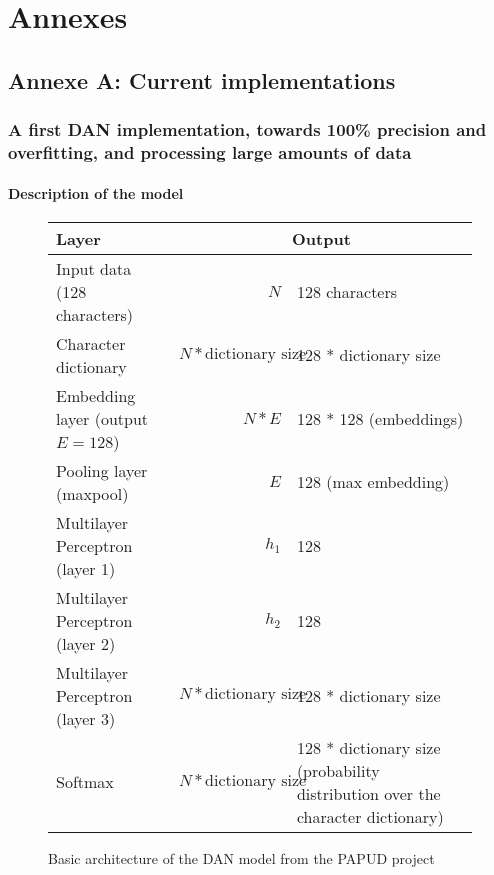 \part*{Annexes}

\chapter*{Annexe A: Current implementations}

\makeatletter
\renewcommand{\thesection}{\@arabic\c@section}
\makeatother

\section{A first DAN implementation, towards 100\% precision and overfitting, and processing large amounts of data\label{annex}}

\subsection{Description of the model}
\begin{figure}[H]
\begin{center}
\begin{tabularx}{.9\textwidth}{|l|r|X|}
	\hline 
	{\bfseries Layer} & \multicolumn{2}{|c|}{\bfseries Output} \\ 
	\hline 
	Input data (128 characters) &  $N$ & {128 characters} \\ 
	\hline 
	Character dictionary & $N * \text{dictionary size}$ & 128 * dictionary size \\ 
	\hline 
	Embedding layer (output $E=128$) & $N * E$ & 128 * 128 (embeddings) \\ 
	\hline 
	Pooling layer (maxpool) & $E$ & 128 (max embedding) \\ 
	\hline 
	Multilayer Perceptron (layer 1) & $h_1$ & 128 \\ 
	\hline 
	Multilayer Perceptron (layer 2) & $h_2$ & 128 \\ 
	\hline 
	Multilayer Perceptron (layer 3) & $N * \text{dictionary size}$ & 128 * dictionary size \\ 
	\hline 
	Softmax & $N * \text{dictionary size}$ & 128 * dictionary size (probability distribution over the character dictionary) \\ 
	\hline 
\end{tabularx} 
\end{center}
\caption{Basic architecture of the DAN model from the PAPUD project}
\end{figure} 

